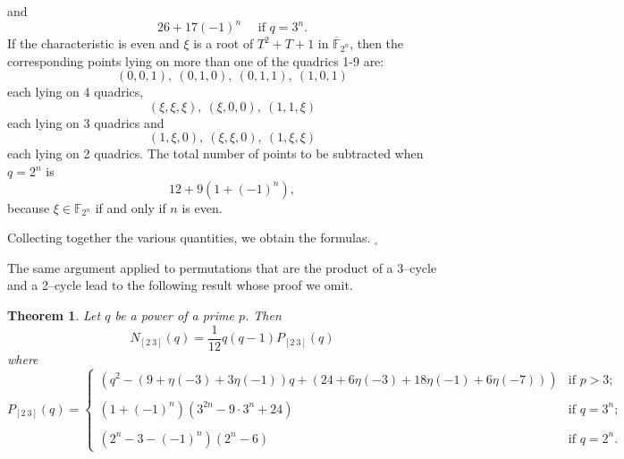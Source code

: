 \documentclass[10pt,a4paper,twoside]{article}
\newtheorem{theorem}{Theorem}[section]
\begin{document}
and
\begin{equation}
26+17(-1)^n \quad \textrm{ if } q=3^n.
\end{equation}
If the characteristic is even and $\xi$ is a root of $T^2+T+1$ in
$\overline{\mathbb F}_{2^n}$,
then the corresponding points lying on more than one of the quadrics 1-9 are:
$$(0,0,1),\ (0,1,0),\ (0,1,1),\ (1,0,1)$$
each lying on 4 quadrics,
$$(\xi,\xi,\xi),\ (\xi,0,0),\ (1,1,\xi)$$
each lying on 3 quadrics and
$$(1,\xi,0),\ (\xi,\xi,0),\ (1,\xi,\xi)$$
each lying on 2 quadrics. The total number of points to be subtracted when $q=2^n$ is
\begin{equation}\label{quarto}
12+9(1+(-1)^n),
\end{equation}
because $\xi\in \mathbb F_{2^n}$ if and only if $n$ is even.

Collecting together the various quantities, we obtain the
formulas. \hfill $_\square$\bigskip

The same argument applied to permutations that are the product of a
3--cycle and a 2--cycle
lead to the following result whose proof we omit.

\begin{theorem}
 Let $q$ be a power of a prime $p$. Then
$$N_{[2\ 3]}(q) =\frac{1}{12}q(q-1)P_{[2\ 3]}(q)$$
where
$$P_{[2\ 3]}(q)=\left\{\begin{array}{ll}
   \left(q^2-(9+\eta(-3)+3\eta(-1))q+(24+6\eta(-3)+
18\eta(-1)+6\eta(-7))\right) & \textrm{if } p>3;\\
\\
(1+(-1)^n)(3^{2n}-9\cdot3^n+24) & \textrm{if } q=3^n;\\
\\
(2^n-3-(-1)^n)(2^n-6) & \textrm{if } q=2^n.
\end{array}\right.$$
\end{theorem}

%
%
%
\end{document}
